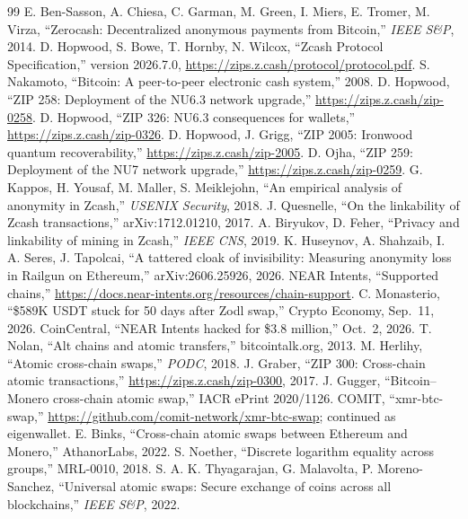 \documentclass[10pt,letterpaper]{article}
\begin{document}
\renewcommand{\refname}{References}
\begin{thebibliography}{99}\small\setlength\itemsep{0.05em}
 E. Ben-Sasson, A. Chiesa, C. Garman, M. Green, I. Miers, E. Tromer, M. Virza, ``Zerocash: Decentralized anonymous payments from Bitcoin,'' \emph{IEEE S\&P}, 2014.
 D. Hopwood, S. Bowe, T. Hornby, N. Wilcox, ``Zcash Protocol Specification,'' version 2026.7.0, \url{https://zips.z.cash/protocol/protocol.pdf}.
 S. Nakamoto, ``Bitcoin: A peer-to-peer electronic cash system,'' 2008.
 D. Hopwood, ``ZIP 258: Deployment of the NU6.3 network upgrade,'' \url{https://zips.z.cash/zip-0258}.
 D. Hopwood, ``ZIP 326: NU6.3 consequences for wallets,'' \url{https://zips.z.cash/zip-0326}.
 D. Hopwood, J. Grigg, ``ZIP 2005: Ironwood quantum recoverability,'' \url{https://zips.z.cash/zip-2005}.
 D. Ojha, ``ZIP 259: Deployment of the NU7 network upgrade,'' \url{https://zips.z.cash/zip-0259}.
 G. Kappos, H. Yousaf, M. Maller, S. Meiklejohn, ``An empirical analysis of anonymity in Zcash,'' \emph{USENIX Security}, 2018.
 J. Quesnelle, ``On the linkability of Zcash transactions,'' arXiv:1712.01210, 2017.
 A. Biryukov, D. Feher, ``Privacy and linkability of mining in Zcash,'' \emph{IEEE CNS}, 2019.
 K. Huseynov, A. Shahzaib, I. A. Seres, J. Tapolcai, ``A tattered cloak of invisibility: Measuring anonymity loss in Railgun on Ethereum,'' arXiv:2606.25926, 2026.
 NEAR Intents, ``Supported chains,'' \url{https://docs.near-intents.org/resources/chain-support}.
 C. Monasterio, ``\$589K USDT stuck for 50 days after Zodl swap,'' Crypto Economy, Sep.\ 11, 2026.
 CoinCentral, ``NEAR Intents hacked for \$3.8 million,'' Oct.\ 2, 2026.
 T. Nolan, ``Alt chains and atomic transfers,'' bitcointalk.org, 2013.
 M. Herlihy, ``Atomic cross-chain swaps,'' \emph{PODC}, 2018.
 J. Graber, ``ZIP 300: Cross-chain atomic transactions,'' \url{https://zips.z.cash/zip-0300}, 2017.
 J. Gugger, ``Bitcoin--Monero cross-chain atomic swap,'' IACR ePrint 2020/1126.
 COMIT, ``xmr-btc-swap,'' \url{https://github.com/comit-network/xmr-btc-swap}; continued as eigenwallet.
 E. Binks, ``Cross-chain atomic swaps between Ethereum and Monero,'' AthanorLabs, 2022.
 S. Noether, ``Discrete logarithm equality across groups,'' MRL-0010, 2018.
 S. A. K. Thyagarajan, G. Malavolta, P. Moreno-Sanchez, ``Universal atomic swaps: Secure exchange of coins across all blockchains,'' \emph{IEEE S\&P}, 2022.

\end{thebibliography}
\end{document}
